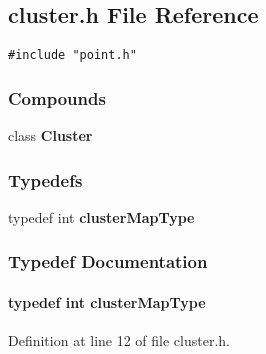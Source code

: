 \subsection{cluster.h File Reference}
\label{cluster.h}
{\tt \#include "point.h"}\par
\subsubsection*{Compounds}
\begin{CompactItemize}
\item 
class {\bf Cluster}
\end{CompactItemize}
\subsubsection*{Typedefs}
\begin{CompactItemize}
\item 
typedef int {\bf cluster\-Map\-Type}
\end{CompactItemize}


\subsubsection{Typedef Documentation}
\label{cluster.h_a0}
\paragraph{\setlength{\rightskip}{0pt plus 5cm}typedef int cluster\-Map\-Type}\hfill



Definition at line 12 of file cluster.h.